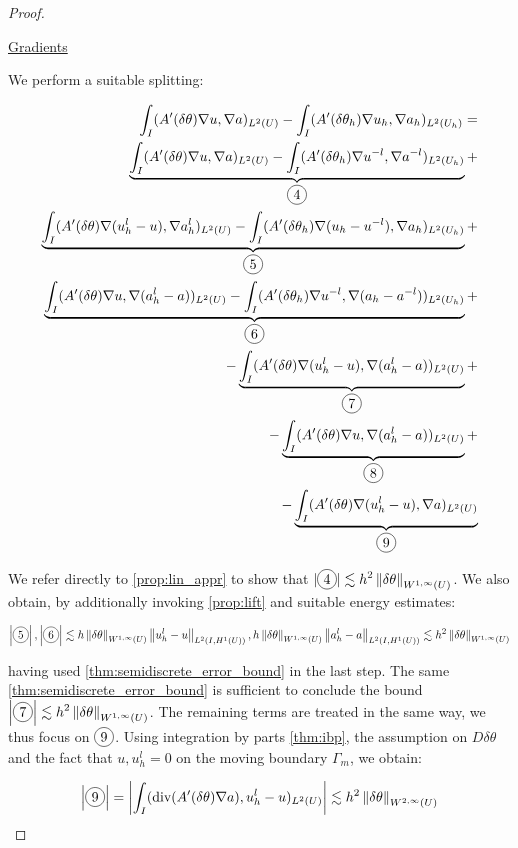 \documentclass[english,a4paper,9pt,oneside]{scrbook}	%
\theoremstyle{break}
\newenvironment{mproof}[1][\proofname]{%
  \begin{proof}[#1]$ $\par\nobreak\ignorespaces
}{%
  \end{proof}
}
\renewcommand*{\proofname}{Proof}
\theoremstyle{remark}
\newcommand{\ds}{\displaystyle}
\newcommand{\norm}[1]{\left\lVert#1\right\rVert}
\newcommand{\te}{\theta}
\newcommand{\dive}{\text{div}}
\newcommand*\circled[1]{\tikz[baseline=(char.base)]{
            \node[shape=circle,draw,inner sep=2pt] (char) {#1};}}
\begin{document}
\begin{mproof}
\underline{Gradients}

We perform a suitable splitting:

\begin{align*}
	\int_I (A'(\delta\te )\nabla u, \nabla a)_{L^2(U)}-\int_I (A'(\delta\te_h )\nabla u_h, \nabla a_h)_{L^2(U_h)} = \\
	\underbrace{\int_I (A'(\delta\te )\nabla u, \nabla a)_{L^2(U)} - \int_I (A'(\delta\te_h )\nabla u^{-l}, \nabla a^{-l})_{L^2(U_h)}}_{\circled{4}}+\\
	\underbrace{\int_I (A'(\delta\te )\nabla (u_h^l-u), \nabla a_h^l)_{L^2(U)} - \int_I (A'(\delta\te_h )\nabla (u_h - u^{-l}), \nabla a_h)_{L^2(U_h)}}_{\circled{5}}+\\
	\underbrace{\int_I (A'(\delta\te )\nabla u, \nabla (a_h^l-a))_{L^2(U)} - \int_I (A'(\delta\te_h )\nabla u^{-l}, \nabla (a_h-a^{-l}))_{L^2(U_h)}}_{\circled{6}}+\\
	- \underbrace{\int_I (A'(\delta\te )\nabla (u_h^l-u), \nabla (a_h^l-a))_{L^2(U)}}_{\circled{7}}+\\
	- \underbrace{\int_I (A'(\delta\te )\nabla u, \nabla (a_h^l-a))_{L^2(U)}}_{\circled{8}}+\\
	- \underbrace{\int_I (A'(\delta\te )\nabla (u_h^l-u), \nabla a)_{L^2(U)}}_{\circled{9}}
\end{align*}

We refer directly to \cref{prop:lin_appr} to show that $\ds |\circled{4}|\lesssim h^2\norm{\delta \te}_{W^{1,\infty}(U)}$. We also obtain, by additionally invoking \cref{prop:lift} and suitable energy estimates:

\begin{align*}
	\left | \circled{5} \right |, \left | \circled{6} \right |\lesssim h \norm{\delta \te}_{W^{1,\infty}(U)} \norm{u_h^l-u}_{L^2(I,H^1(U))},  h \norm{\delta \te}_{W^{1,\infty}(U)} \norm{a_h^l-a}_{L^2(I,H^1(U))}\lesssim h^2 \norm{\delta \te}_{W^{1,\infty}(U)}
\end{align*}

having used \cref{thm:semidiscrete_error_bound} in the last step. The same \cref{thm:semidiscrete_error_bound} is sufficient to conclude the bound $\ds \left | \circled{7} \right | \lesssim h^2 \norm{\delta \te}_{W^{1,\infty}(U)}$. The remaining terms are treated in the same way, we thus focus on $\circled{9}$. Using integration by parts \cref{thm:ibp}, the assumption on $D\delta \te$ and the fact that $u, u^l_h=0$ on the moving boundary $\Gamma_m$, we obtain:

\begin{align*}
	\left |\circled{9} \right |= \left |\int_I(\dive(A'(\delta \te)\nabla a), u_h^l-u)_{L^2(U)}\right |\lesssim h^2 \norm{\delta \te}_{W^{2,\infty}(U)}
\end{align*}


\end{mproof}
\end{document}
